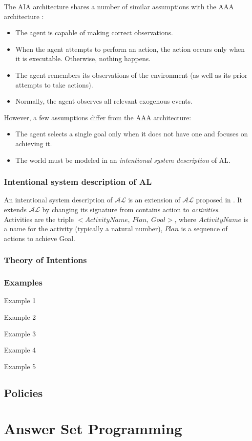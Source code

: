 The AIA architecture shares a number of similar assumptions with the AAA architecture \cite{blount_towards_2014}:

\begin{itemize}
    \item The agent is capable of making correct observations.
    \item When the agent attempts to perform an action, the action occurs only when it is executable.
        Otherwise, nothing happens.
    \item The agent remembers its observations of the environment (as well as its prior attempts to take actions).
    \item Normally, the agent observes all relevant exogenous events.
\end{itemize}

However, a few assumptions differ from the AAA architecture:

\begin{itemize}
    \item The agent selects a single goal only when it does not have one and focuses on achieving it.
    \item The world must be modeled in an \textit{intentional system description} of AL.
\end{itemize}

\subsubsection{Intentional system description of AL}
\label{subsubsec:intentional_action_language_al}

An intentional system description of $ \mathcal{AL} $ is an extension of $ \mathcal{AL} $ proposed in \cite{blount_architecture_2013}.
It extends $ \mathcal{AL} $ by changing its signature from contains action to \textit{activities}.
Activities are the triple $<ActivityName,\ Plan,\ Goal>$, where $ActivityName$ is a name for the activity (typically a natural number), $Plan$ is a sequence of actions to achieve Goal.

\subsubsection{Theory of Intentions}
\label{subsubsec:theory_of_intentions}

\subsubsection{Examples}
\label{subsubsec:aia_examples}

Example 1

Example 2

Example 3

Example 4

Example 5

\subsection{Policies}
\label{subsec:policies}

\section{Answer Set Programming}
\label{sec:asp}

